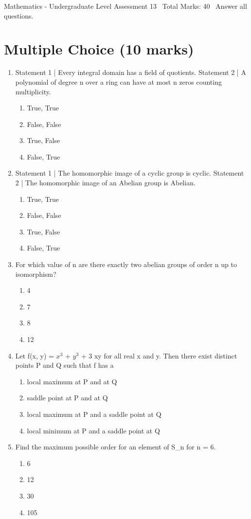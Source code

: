 \documentclass[12pt]{article}
\begin{document}
\begin{center}
Mathematics - Undergraduate Level Assessment 13 \
Total Marks: 40 \
Answer all questions.
\end{center}

\section*{Multiple Choice (10 marks)}
\begin{enumerate}[label=\arabic*.]
\item Statement 1 | Every integral domain has a field of quotients. Statement 2 | A polynomial of degree n over a ring can have at most n zeros counting multiplicity.
\begin{enumerate}[label=(\alph*)]
    \item True, True
    \item False, False
    \item True, False
    \item False, True
\end{enumerate}
\item Statement 1 | The homomorphic image of a cyclic group is cyclic. Statement 2 | The homomorphic image of an Abelian group is Abelian.
\begin{enumerate}[label=(\alph*)]
    \item True, True
    \item False, False
    \item True, False
    \item False, True
\end{enumerate}
\item For which value of n are there exactly two abelian groups of order n up to isomorphism?
\begin{enumerate}[label=(\alph*)]
    \item 4
    \item 7
    \item 8
    \item 12
\end{enumerate}
\item Let f(x, y) = $x^3$ + $y^3$ + 3 xy for all real x and y. Then there exist distinct points P and Q such that f has a
\begin{enumerate}[label=(\alph*)]
    \item local maximum at P and at Q
    \item saddle point at P and at Q
    \item local maximum at P and a saddle point at Q
    \item local minimum at P and a saddle point at Q
\end{enumerate}
\item Find the maximum possible order for an element of S\_n for n = 6.
\begin{enumerate}[label=(\alph*)]
    \item 6
    \item 12
    \item 30
    \item 105
\end{enumerate}
\end{enumerate}
\end{document}
